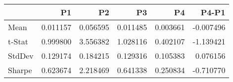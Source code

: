 \begin{tabular}{lrrrrr}
\toprule
 & P1 & P2 & P3 & P4 & P4-P1 \\
\midrule
Mean & 0.011157 & 0.056595 & 0.011485 & 0.003661 & -0.007496 \\
t-Stat & 0.999800 & 3.556382 & 1.028116 & 0.402107 & -1.139421 \\
StdDev & 0.129174 & 0.184215 & 0.129316 & 0.105383 & 0.076156 \\
Sharpe & 0.623674 & 2.218469 & 0.641338 & 0.250834 & -0.710770 \\
\bottomrule
\end{tabular}
